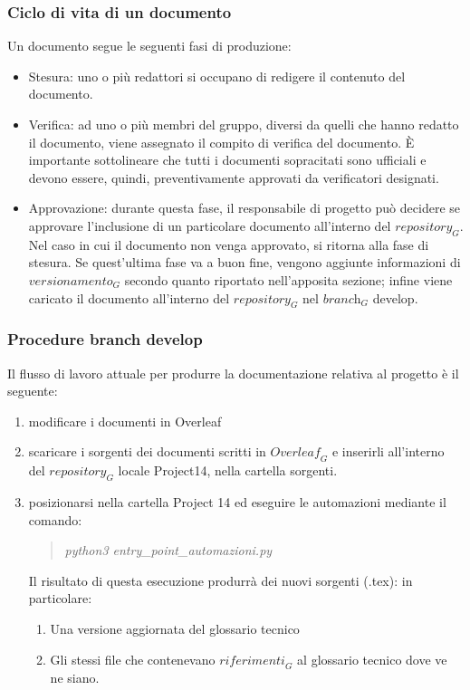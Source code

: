 \subsubsection{Ciclo di vita di un documento}
Un documento segue le seguenti fasi di produzione:
\begin{itemize}
    \item Stesura: uno o più redattori si occupano di redigere il contenuto del documento.
    \item Verifica: ad uno o più membri del gruppo, diversi da quelli che hanno redatto il documento, viene assegnato il compito di verifica del documento.
È importante sottolineare che tutti i documenti sopracitati sono ufficiali e devono essere, quindi, preventivamente approvati da verificatori designati.
    \item Approvazione: durante questa fase, il responsabile di progetto può decidere se approvare l'inclusione di un particolare documento all'interno del $\textit{repository}_G$. Nel caso in cui il documento non venga approvato, si ritorna alla fase di stesura.
    Se quest'ultima fase va a buon fine, vengono aggiunte informazioni di $\textit{versionamento}_G$ secondo quanto riportato nell'apposita sezione; infine viene caricato il documento all'interno del $\textit{repository}_G$ nel $\textit{branch}_G$ develop.
\end{itemize}


\subsubsection{Procedure branch develop }

Il flusso di lavoro attuale per produrre la documentazione relativa al progetto è il seguente:
\begin{enumerate}
    \item modificare i documenti in Overleaf
    \item scaricare i sorgenti dei documenti scritti in $\textit{Overleaf}_G$ e inserirli all'interno del $\textit{repository}_G$ locale Project14, nella cartella sorgenti.
    \item posizionarsi nella cartella Project 14 ed eseguire le automazioni mediante il comando:
        \begin{quote}
            \emph{  python3 entry\_point\_automazioni.py} 
        \end{quote}
    Il risultato di questa esecuzione produrrà dei nuovi sorgenti (.tex): in particolare:
    \begin{enumerate}
        \item Una versione aggiornata del glossario tecnico
        \item Gli stessi file che contenevano $\textit{riferimenti}_G$ al glossario tecnico dove ve ne siano.
    \end{enumerate}
\end{enumerate}

